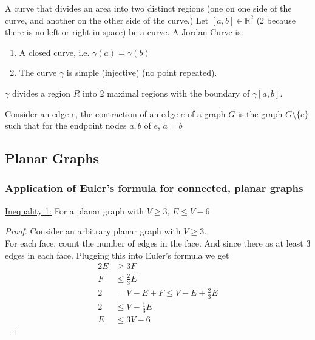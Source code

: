 \documentclass[12pt]{article}
\begin{document}
\begin{tcolorbox}[title=Definition: Jordan Curve Theorem]
	A curve that divides an area into two distinct regions (one on one side of the curve, and another on the other side of the curve.)
	Let $[a,b] \in \mathbb{R}^2$ (2 because there is no left or right in space) be a curve.
	A Jordan Curve is:
	\begin{enumerate}
		\item{A closed curve, i.e. $\gamma (a) = \gamma (b)$}
		\item{The curve $\gamma$ is simple (injective) (no point repeated).}
	\end{enumerate}
	$\gamma$ divides a region $R$ into 2 maximal regions with the boundary of $\gamma[a,b]$.
\end{tcolorbox}

\begin{tcolorbox}[title=Definition: Contraction of an edge]
	Consider an edge $e$, the contraction of an edge $e$ of a graph $G$ is the graph $G \setminus \{ e \}$ such that for the endpoint nodes $a,b$ of $e$, $a=b$
\end{tcolorbox}

\subsection{Planar Graphs}

\subsubsection{Application of Euler's formula for connected, planar graphs}

\begin{tcolorbox}
	\underline{Inequality 1:} For a planar graph with $V \geq 3$, $E \leq V-6$
\end{tcolorbox}

\begin{proof}
	Consider an arbitrary planar graph with $V \geq 3$.\\
	For each face, count the number of edges in the face. And since there as at least 3 edges in each face. Plugging this into Euler's formula we get
	\begin{align*}
		2E &\geq 3F\\
		F &\leq \frac{2}{3} E\\
		2 &= V-E+F \leq V-E+\frac{2}{3} E\\
		2 &\leq V - \frac{1}{3} E\\
		E &\leq 3V - 6
	\end{align*}
\end{proof}
\end{document}
